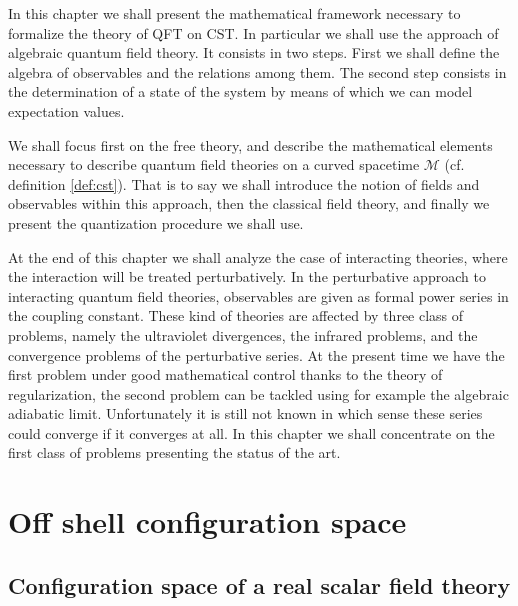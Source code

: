 \documentclass[11pt]{book}
\newcommand{\Mcal}{\mathcal{M}}
\theoremstyle{break}
\begin{document}
In this chapter we shall present the mathematical framework necessary to formalize the theory of QFT on CST. In particular we shall use the approach of algebraic quantum field theory. It consists in two steps. First we shall define the algebra of observables and the relations among them. The second step consists in the determination of a state of the system by means of which we can model expectation values.


We shall focus first on the free theory, and describe the mathematical elements necessary to describe quantum field theories on a curved spacetime $\Mcal$ (cf. definition \ref{def:cst}). That is to say we shall introduce the notion of fields and observables within this approach, then the classical field theory, and finally we present the quantization procedure we shall use.


At the end of this chapter we shall analyze the case of interacting theories, where the interaction will be treated perturbatively. In the perturbative approach to interacting quantum field theories, observables are given as formal power series in the coupling constant. These kind of theories are affected by three class of problems, namely the ultraviolet divergences, the infrared problems, and the convergence problems of the perturbative series. At the present time we have the first problem under good mathematical control thanks to the theory of regularization, the second problem can be tackled using for example the algebraic adiabatic limit. Unfortunately it is still not known in which sense these series could converge if it converges at all. In this chapter we shall concentrate on the first class of problems presenting the status of the art.


\section{Off shell configuration space}
\label{p:OFF_SHELL_CONFIG_SPACE}


\subsection{Configuration space of a real scalar field theory}
\label{p:DEF_CONFIG_SPACE}
\end{document}
